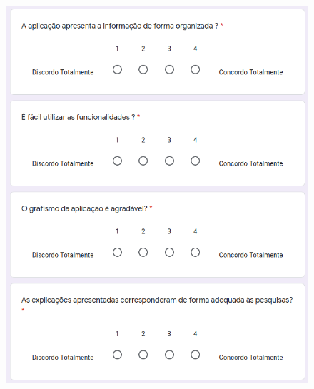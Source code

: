 \begin{figure}[H]
    \centering
    \includegraphics[scale=0.7]{appendices/assets/survey2.png}
    \label{fig:survey2}
\end{figure}

